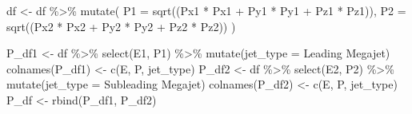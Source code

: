 \documentclass[
]{article}
\newenvironment{Shaded}{\begin{snugshade}}{\end{snugshade}}
\newcommand{\AttributeTok}[1]{\textcolor[rgb]{0.77,0.63,0.00}{#1}}
\newcommand{\FunctionTok}[1]{\textcolor[rgb]{0.00,0.00,0.00}{#1}}
\newcommand{\NormalTok}[1]{#1}
\newcommand{\OtherTok}[1]{\textcolor[rgb]{0.56,0.35,0.01}{#1}}
\newcommand{\SpecialCharTok}[1]{\textcolor[rgb]{0.00,0.00,0.00}{#1}}
\newcommand{\StringTok}[1]{\textcolor[rgb]{0.31,0.60,0.02}{#1}}
\begin{document}
\begin{Shaded}
\begin{Highlighting}[]
\NormalTok{df }\OtherTok{\textless{}{-}}\NormalTok{ df }\SpecialCharTok{\%\textgreater{}\%} 
  \FunctionTok{mutate}\NormalTok{(}
    \AttributeTok{P1 =} \FunctionTok{sqrt}\NormalTok{((Px1 }\SpecialCharTok{*}\NormalTok{ Px1 }\SpecialCharTok{+}\NormalTok{ Py1 }\SpecialCharTok{*}\NormalTok{ Py1 }\SpecialCharTok{+}\NormalTok{ Pz1 }\SpecialCharTok{*}\NormalTok{ Pz1)),}
    \AttributeTok{P2 =} \FunctionTok{sqrt}\NormalTok{((Px2 }\SpecialCharTok{*}\NormalTok{ Px2 }\SpecialCharTok{+}\NormalTok{ Py2 }\SpecialCharTok{*}\NormalTok{ Py2 }\SpecialCharTok{+}\NormalTok{ Pz2 }\SpecialCharTok{*}\NormalTok{ Pz2))}
\NormalTok{  )}

\NormalTok{P\_df1 }\OtherTok{\textless{}{-}}\NormalTok{ df }\SpecialCharTok{\%\textgreater{}\%}
  \FunctionTok{select}\NormalTok{(E1, P1) }\SpecialCharTok{\%\textgreater{}\%}
    \FunctionTok{mutate}\NormalTok{(}\AttributeTok{jet\_type =} \StringTok{\textquotesingle{}Leading Megajet\textquotesingle{}}\NormalTok{)}
\FunctionTok{colnames}\NormalTok{(P\_df1) }\OtherTok{\textless{}{-}} \FunctionTok{c}\NormalTok{(}\StringTok{\textquotesingle{}E\textquotesingle{}}\NormalTok{, }\StringTok{\textquotesingle{}P\textquotesingle{}}\NormalTok{, }\StringTok{\textquotesingle{}jet\_type\textquotesingle{}}\NormalTok{)}
\NormalTok{P\_df2 }\OtherTok{\textless{}{-}}\NormalTok{ df }\SpecialCharTok{\%\textgreater{}\%}
  \FunctionTok{select}\NormalTok{(E2, P2) }\SpecialCharTok{\%\textgreater{}\%}
    \FunctionTok{mutate}\NormalTok{(}\AttributeTok{jet\_type =} \StringTok{\textquotesingle{}Subleading Megajet\textquotesingle{}}\NormalTok{)}
\FunctionTok{colnames}\NormalTok{(P\_df2) }\OtherTok{\textless{}{-}} \FunctionTok{c}\NormalTok{(}\StringTok{\textquotesingle{}E\textquotesingle{}}\NormalTok{, }\StringTok{\textquotesingle{}P\textquotesingle{}}\NormalTok{, }\StringTok{\textquotesingle{}jet\_type\textquotesingle{}}\NormalTok{)}
\NormalTok{P\_df }\OtherTok{\textless{}{-}} \FunctionTok{rbind}\NormalTok{(P\_df1, P\_df2)}



\end{Highlighting}
\end{Shaded}
\end{document}
